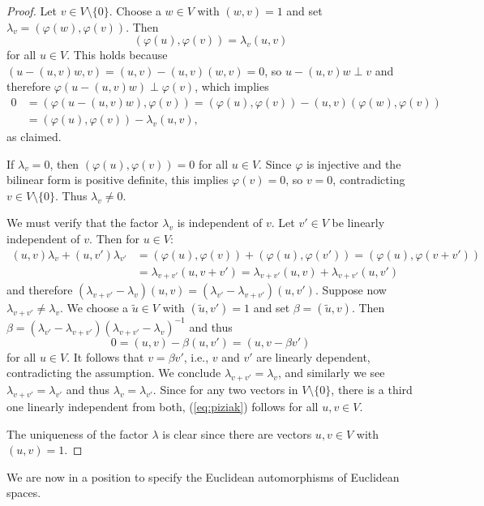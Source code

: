 \documentclass[11pt,a4paper]{article}
\begin{document}
\begin{proof}
Let $v \in V \setminus \{0\}$. Choose a $w \in V$ with $(w, v) = 1$ and set $\lambda_v = (\varphi(w), \varphi(v))$. Then
\[ (\varphi(u), \varphi(v)) = \lambda_v (u, v) \]
for all $u \in V$. This holds because $(u - (u, v)w, v) = (u, v) - (u, v)(w, v) = 0$, so $u - (u, v)w \perp v$ and therefore $\varphi(u - (u, v)w) \perp \varphi(v)$, which implies
\begin{align*}
    0 &= (\varphi(u - (u, v)w), \varphi(v)) = (\varphi(u), \varphi(v)) - (u, v)(\varphi(w), \varphi(v)) \\
    &= (\varphi(u), \varphi(v)) - \lambda_v(u, v),
\end{align*}
as claimed.

If $\lambda_v = 0$, then $(\varphi(u), \varphi(v)) = 0$ for all $u \in V$. Since $\varphi$ is injective and the bilinear form is positive definite, this implies $\varphi(v) = 0$, so $v = 0$, contradicting $v \in V \setminus \{0\}$. Thus $\lambda_v \neq 0$.

We must verify that the factor $\lambda_v$ is independent of $v$. Let $v' \in V$ be linearly independent of $v$. Then for $u \in V$:
\begin{align*}
    (u, v)\lambda_v + (u, v')\lambda_{v'} &= (\varphi(u), \varphi(v)) + (\varphi(u), \varphi(v')) = (\varphi(u), \varphi(v + v')) \\
    &= \lambda_{v+v'}(u, v + v') = \lambda_{v+v'}(u, v) + \lambda_{v+v'}(u, v')
\end{align*}
and therefore $(\lambda_{v+v'} - \lambda_v)(u, v) = (\lambda_{v'} - \lambda_{v+v'})(u, v')$. Suppose now $\lambda_{v+v'} \neq \lambda_v$. We choose a $\tilde{u} \in V$ with $(\tilde{u}, v') = 1$ and set $\beta = (\tilde{u}, v)$. Then $\beta = (\lambda_{v'} - \lambda_{v+v'})(\lambda_{v+v'} - \lambda_v)^{-1}$ and thus
\[ 0 = (u, v) - \beta(u, v') = (u, v - \beta v') \]
for all $u \in V$. It follows that $v = \beta v'$, i.e., $v$ and $v'$ are linearly dependent, contradicting the assumption. We conclude $\lambda_{v+v'} = \lambda_v$, and similarly we see $\lambda_{v+v'} = \lambda_{v'}$ and thus $\lambda_v = \lambda_{v'}$. Since for any two vectors in $V \setminus \{0\}$, there is a third one linearly independent from both, (\ref{eq:piziak}) follows for all $u, v \in V$.

The uniqueness of the factor $\lambda$ is clear since there are vectors $u, v \in V$ with $(u, v) = 1$.
\end{proof}

We are now in a position to specify the Euclidean automorphisms of Euclidean spaces.
\end{document}
